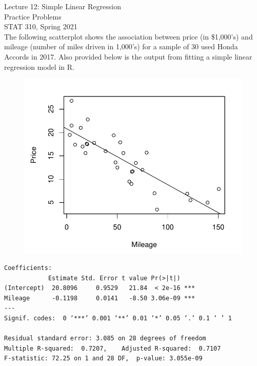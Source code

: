 \documentclass[11pt]{article}\usepackage[]{graphicx}\usepackage[]{color}
\begin{document}
\setlength\parindent{0pt}




Lecture 12: Simple Linear Regression\\
Practice Problems\\
STAT 310, Spring 2021\\

The following scatterplot shows the association between price (in \$1,000's) and mileage (number of miles driven in 1,000's) for a sample of 30 used Honda Accords in 2017.  Also provided below is the output from fitting a simple linear regression model in R.\\

\begin{figure}[ht]
\includegraphics[scale=0.75]{figure/scatter_cars.pdf}
\end{figure}

\begin{verbatim}
Coefficients:
            Estimate Std. Error t value Pr(>|t|)    
(Intercept)  20.8096     0.9529   21.84  < 2e-16 ***
Mileage      -0.1198     0.0141   -8.50 3.06e-09 ***
---
Signif. codes:  0 ‘***’ 0.001 ‘**’ 0.01 ‘*’ 0.05 ‘.’ 0.1 ‘ ’ 1

Residual standard error: 3.085 on 28 degrees of freedom
Multiple R-squared:  0.7207,	Adjusted R-squared:  0.7107 
F-statistic: 72.25 on 1 and 28 DF,  p-value: 3.055e-09
\end{verbatim}
\vspace{2pt}
\end{document}
